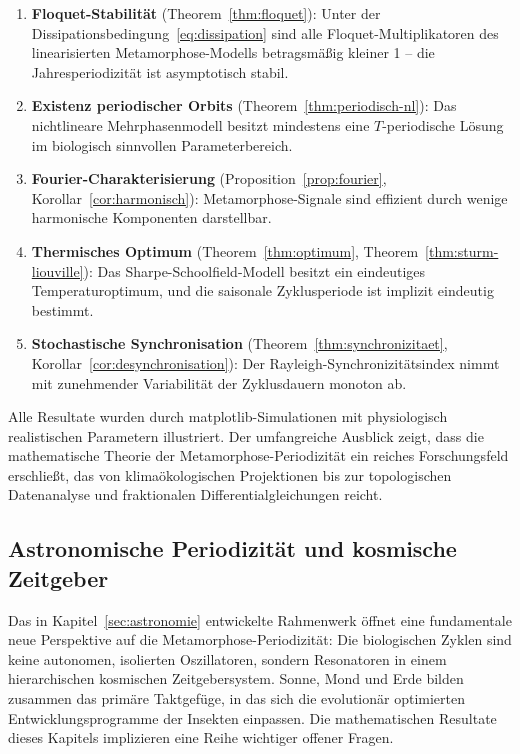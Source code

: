﻿\documentclass[12pt, a4paper]{article}
\theoremstyle{definition}
\begin{document}
\begin{enumerate}[leftmargin=1.5cm]
  \item \textbf{Floquet-Stabilität} (Theorem~\ref{thm:floquet}): Unter der
    Dissipationsbedingung~\eqref{eq:dissipation} sind alle Floquet-Multiplikatoren
    des linearisierten Metamorphose-Modells betragsmäßig kleiner 1 -- die
    Jahresperiodizität ist asymptotisch stabil.
  \item \textbf{Existenz periodischer Orbits} (Theorem~\ref{thm:periodisch-nl}):
    Das nichtlineare Mehrphasenmodell besitzt mindestens eine $T$-periodische
    Lösung im biologisch sinnvollen Parameterbereich.
  \item \textbf{Fourier-Charakterisierung} (Proposition~\ref{prop:fourier},
    Korollar~\ref{cor:harmonisch}): Metamorphose-Signale sind effizient durch
    wenige harmonische Komponenten darstellbar.
  \item \textbf{Thermisches Optimum} (Theorem~\ref{thm:optimum},
    Theorem~\ref{thm:sturm-liouville}): Das Sharpe-Schoolfield-Modell besitzt
    ein eindeutiges Temperaturoptimum, und die saisonale Zyklusperiode ist
    implizit eindeutig bestimmt.
  \item \textbf{Stochastische Synchronisation} (Theorem~\ref{thm:synchronizitaet},
    Korollar~\ref{cor:desynchronisation}): Der Rayleigh-Synchronizitätsindex
    nimmt mit zunehmender Variabilität der Zyklusdauern monoton ab.
\end{enumerate}

Alle Resultate wurden durch matplotlib-Simulationen mit physiologisch
realistischen Parametern illustriert. Der umfangreiche Ausblick zeigt, dass
die mathematische Theorie der Metamorphose-Periodizität ein reiches Forschungsfeld
erschließt, das von klimaökologischen Projektionen bis zur topologischen
Datenanalyse und fraktionalen Differentialgleichungen reicht.

\subsection{Astronomische Periodizität und kosmische Zeitgeber}

Das in Kapitel~\ref{sec:astronomie} entwickelte Rahmenwerk öffnet eine
fundamentale neue Perspektive auf die Metamorphose-Periodizität: Die biologischen
Zyklen sind keine autonomen, isolierten Oszillatoren, sondern Resonatoren in einem
hierarchischen kosmischen Zeitgebersystem. Sonne, Mond und Erde bilden zusammen
das primäre Taktgefüge, in das sich die evolutionär optimierten Entwicklungsprogramme
der Insekten einpassen. Die mathematischen Resultate dieses Kapitels implizieren
eine Reihe wichtiger offener Fragen.
\end{document}
